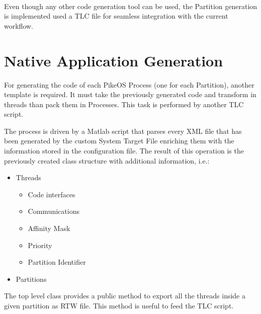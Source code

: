 \paragraph{} Even though any other code generation tool can be used, the Partition generation is implemented used a TLC file for seamless integration with the current workflow.

\section{Native Application Generation}
For generating the code of each PikeOS Process (one for each Partition), another template is required. It must take the previously generated code and transform in threads than pack them in Processes. This task is performed by another TLC script.
\par The process is driven by a Matlab script that parses every XML file that has been generated by the custom System Target File enriching them with the information stored in the configuration file. The result of this operation is the previously created class structure with additional information, i.e.:
\begin{itemize}
\item Threads
\begin{itemize}
\item Code interfaces
\item Communications
\item Affinity Mask
\item Priority
\item Partition Identifier
\end{itemize}
\item Partitions
\end{itemize}
The top level class provides a public method to export all the threads inside a given partition as RTW file. This method is useful to feed the TLC script.

